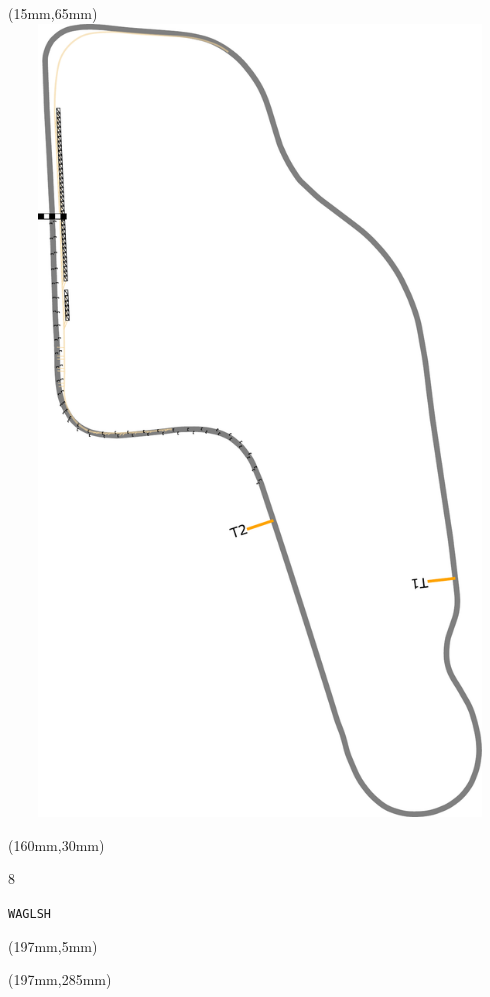\begin{textblock*}{185mm}(15mm,65mm)%
\centering
\mbox{\includegraphics[width=185mm,height=210mm,keepaspectratio]{PT/WAGLSH.pdf}}
\end{textblock*}
\begin{textblock*}{40mm}(160mm,30mm)%
\Large
\par{} 
\par8 
\par\hfill\tiny\tt WAGLSH\\
\end{textblock*}
\begin{textblock*}{20mm}(197mm,5mm)%
\fbox{\thepage}
\label{WAGLSH}
\end{textblock*}
\begin{textblock*}{20mm}(197mm,285mm)%
\fbox{\thepage}
\end{textblock*}

